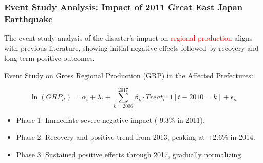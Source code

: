\documentclass[serif, aspectratio=169]{beamer}
\newcommand{\returnbutton}[2]{%
  \vspace{-1.0cm}  %
  \hfill  %
  \hyperlink{#1}{%
    {\footnotesize\beamerbutton{#2}}%
  }%
  \vspace{0.3cm}  %
}
\begin{document}
\begin{frame}[label=event_study_results]
\frametitle{Event Study Analysis: Impact of 2011 Great East Japan Earthquake}

\vspace{0.20cm}

\returnbutton{literature_review1}{Return}

\vspace{-0.20cm}

The event study analysis of the disaster's impact on \textcolor{red}{regional production} aligns with previous literature, showing initial negative effects followed by recovery and long-term positive outcomes.

    \begin{minipage}[c]{0.4\linewidth}
        \small
        \vspace{-1.6cm}
        
Event Study on Gross Regional Production (GRP) in the Affected Prefectures:

\vspace{-0.3cm}

\fontsize{8}{10}\selectfont
\begin{equation}
\ln(GRP_{it}) = \alpha_i + \lambda_t + \sum_{k=2006}^{2017} \beta_k \cdot Treat_i \cdot 1[t-2010=k] + \epsilon_{it}
\end{equation}

\normalsize

\begin{itemize}
    \item Phase 1: Immediate severe negative impact (-9.3\% in 2011).
    \item Phase 2: Recovery and positive trend from 2013, peaking at +2.6\% in 2014.
    \item Phase 3: Sustained positive effects through 2017, gradually normalizing.
\end{itemize}
        
        \vspace{-2.0cm}
        

\end{minipage}
\end{frame}
\end{document}
